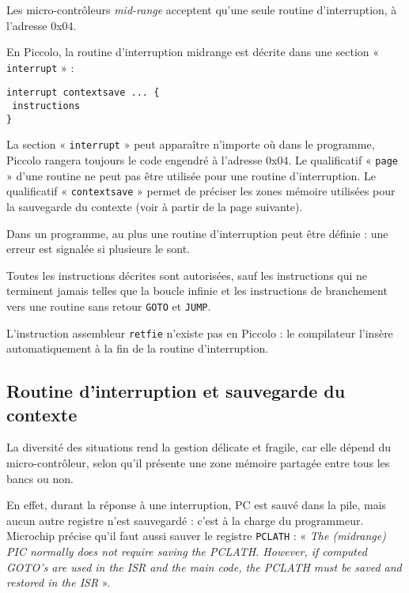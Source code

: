 


Les micro-contrôleurs \emph{mid-range} acceptent qu’une seule routine d’interruption, à l’adresse 0x04.

En Piccolo, la routine d’interruption midrange est décrite dans une section « \texttt{interrupt} » :

\begin{lstlisting}[language=piccolo]
interrupt contextsave ... {
 instructions
}
\end{lstlisting}

La section « \texttt{interrupt} » peut apparaître n’importe où dans le programme, Piccolo rangera toujours le code engendré à l’adresse 0x04. Le qualificatif « \texttt{page} » d’une routine ne peut pas être utilisée pour une routine d’interruption. Le qualificatif « \texttt{contextsave} » permet de préciser les zones mémoire utilisées pour la sauvegarde du contexte (voir à partir de la page suivante).

Dans un programme, au plus une routine d’interruption peut être définie : une erreur est signalée si plusieurs le sont.

Toutes les instructions décrites sont autorisées, sauf les instructions qui ne terminent jamais telles que la boucle infinie et les instructions de branchement vers une routine sans retour \texttt{GOTO} et \texttt{JUMP}.

L’instruction assembleur \texttt{retfie} n’existe pas en Piccolo : le compilateur l’insère automatiquement à la fin de la routine d’interruption.


\subsection{Routine d’interruption et sauvegarde du contexte}

La diversité des situations rend la gestion délicate et fragile, car elle dépend du micro-contrôleur, selon qu'il présente une zone mémoire partagée entre tous les bancs ou non.

En effet, durant la réponse à une interruption, PC est sauvé dans la pile, mais aucun autre registre n’est sauvegardé : c’est à la charge du programmeur. Microchip précise qu’il faut aussi sauver le registre \texttt{PCLATH} : « \emph{The (midrange) PIC normally does not require saving the PCLATH. However, if computed GOTO’s are used in the ISR and the main code, the PCLATH must be saved and restored in the ISR} ».



